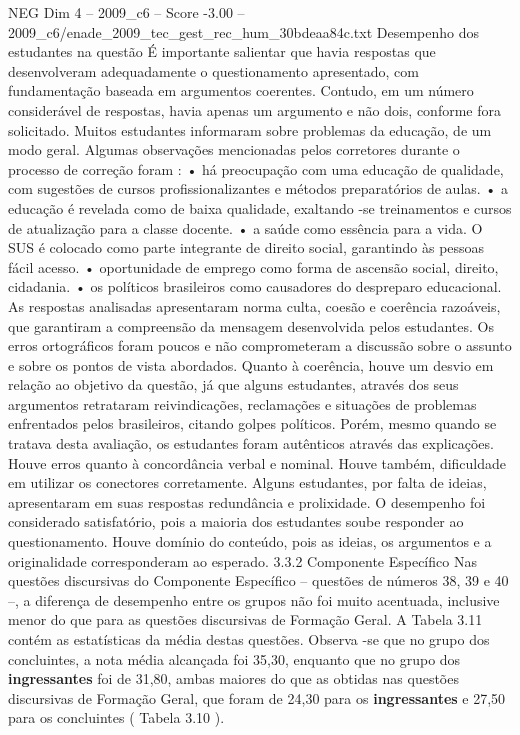 \begin{textsample}{NEG Dim 4 – 2009\_c6 – Score -3.00 – 2009\_c6/enade\_2009\_tec\_gest\_rec\_hum\_30bdeaa84c.txt}
Desempenho dos estudantes na questão É importante salientar que havia respostas que desenvolveram adequadamente o questionamento apresentado, com fundamentação baseada em argumentos coerentes.
Contudo, em um número considerável de respostas, havia apenas um argumento e não dois, conforme fora solicitado.
Muitos estudantes informaram sobre problemas da educação, de um modo geral.
Algumas observações mencionadas pelos corretores durante o processo de correção foram : • há preocupação com uma educação de qualidade, com sugestões de cursos profissionalizantes e métodos preparatórios de aulas. • a educação é revelada como de baixa qualidade, exaltando -se treinamentos e cursos de atualização para a classe docente. • a saúde como essência para a vida.
O SUS é colocado como parte integrante de direito social, garantindo às pessoas fácil acesso. • oportunidade de emprego como forma de ascensão social, direito, cidadania. • os políticos brasileiros como causadores do despreparo educacional.
As respostas analisadas apresentaram norma culta, coesão e coerência razoáveis, que garantiram a compreensão da mensagem desenvolvida pelos estudantes.
Os erros ortográficos foram poucos e não comprometeram a discussão sobre o assunto e sobre os pontos de vista abordados.
Quanto à coerência, houve um desvio em relação ao objetivo da questão, já que alguns estudantes, através dos seus argumentos retrataram reivindicações, reclamações e situações de problemas enfrentados pelos brasileiros, citando golpes políticos.
Porém, mesmo quando se tratava desta avaliação, os estudantes foram autênticos através das explicações.
Houve erros quanto à concordância verbal e nominal.
Houve também, dificuldade em utilizar os conectores corretamente.
Alguns estudantes, por falta de ideias, apresentaram em suas respostas redundância e prolixidade.
O desempenho foi considerado satisfatório, pois a maioria dos estudantes soube responder ao questionamento.
Houve domínio do conteúdo, pois as ideias, os argumentos e a originalidade corresponderam ao esperado. 3.3.2 Componente Específico Nas questões discursivas do Componente Específico – questões de números 38, 39 e 40 –, a diferença de desempenho entre os grupos não foi muito acentuada, inclusive menor do que para as questões discursivas de Formação Geral.
A Tabela 3.11 contém as estatísticas da média destas questões.
Observa -se que no grupo dos concluintes, a nota média alcançada foi 35,30, enquanto que no grupo dos \textbf{ingressantes} foi de 31,80, ambas maiores do que as obtidas nas questões discursivas de Formação Geral, que foram de 24,30 para os \textbf{ingressantes} e 27,50 para os concluintes ( Tabela 3.10 ).

\end{textsample}
